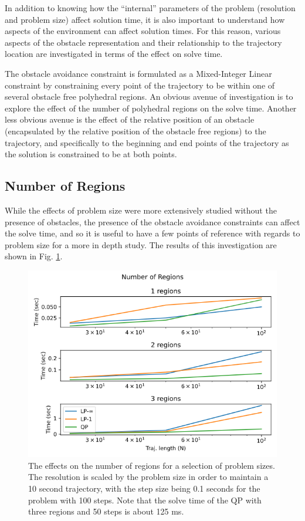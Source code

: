 In addition to knowing how the ``internal'' parameters of the problem (resolution and problem size) affect solution time, it is also important to understand how aspects of the environment can affect solution times. For this reason, various aspects of the obstacle representation and their relationship to the trajectory location are investigated in terms of the effect on solve time.

The obstacle avoidance constraint is formulated as a Mixed-Integer Linear constraint by constraining every point of the trajectory to be within one of several obstacle free polyhedral regions. An obvious avenue of investigation is to explore the effect of the number of polyhedral regions on the solve time. Another less obvious avenue is the effect of the relative position of an obstacle (encapsulated by the relative position of the obstacle free regions) to the trajectory, and specifically to the beginning and end points of the trajectory as the solution is constrained to be at both points.

\subsection{Number of Regions} \label{ssec:number_of_regions}
While the effects of problem size were more extensively studied without the presence of obstacles, the presence of the obstacle avoidance constraints can affect the solve time, and so it is useful to have a few points of reference with regards to problem size for a more in depth study. The results of this investigation are shown in Fig. \ref{fig:number_of_regions}.
\begin{figure}
    \centering
    \includegraphics[width=\linewidth]{figs/Number_of_Regions.png}
    \caption{The effects on the number of regions for a selection of problem sizes. The resolution is scaled by the problem size in order to maintain a 10 second trajectory, with the step size being 0.1 seconds for the problem with 100 steps. Note that the solve time of the QP with three regions and 50 steps is about 125 ms.}
    \label{fig:number_of_regions}
\end{figure}

